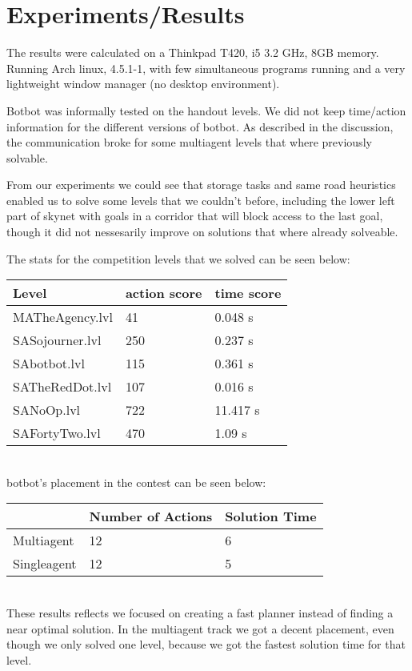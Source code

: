 \documentclass[letterpaper]{article}
\begin{document}
\section{Experiments/Results}
The results were calculated on a Thinkpad T420, i5 3.2 GHz, 8GB memory.
Running Arch linux, 4.5.1-1, with few simultaneous programs running and a very
lightweight window manager (no desktop environment).

Botbot was informally tested on the handout levels. We did not keep time/action
information for the different versions of botbot. As described in the discussion,
the communication broke for some multiagent levels that where previously solvable.

From our experiments we could see that storage tasks and same road heuristics enabled
us to solve some levels that we couldn't before, including the lower left part of skynet
with goals in a corridor that will block access to the last goal, though it did not
nessesarily improve on solutions that where already solveable.

The stats for the competition levels that we solved can be seen below:\\

\begin{tabular}{l|l|l}
Level & action score & time score \\
\hline
MATheAgency.lvl & 41 & 0.048 s\\
\hline
SASojourner.lvl & 250 & 0.237 s\\
SAbotbot.lvl & 115 & 0.361 s\\
SATheRedDot.lvl & 107 & 0.016 s\\
SANoOp.lvl & 722 &11.417 s\\
SAFortyTwo.lvl & 470 & 1.09 s\
\end{tabular}\\

botbot's placement in the contest can be seen below:\\

\begin{tabular}{l|l|l}
 & Number of Actions & Solution Time \\
\hline
Multiagent & 12 & 6 \\
Singleagent & 12 & 5 \\
\end{tabular}\\

These results reflects we focused on creating a fast planner instead of finding
a near optimal solution. In the multiagent track we got a decent placement, even
though we only solved one level, because we got the fastest solution time for that level.
\end{document}
